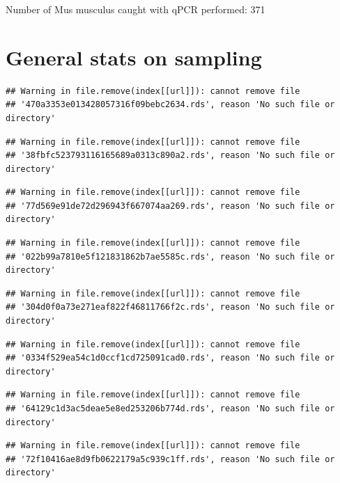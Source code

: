 \documentclass[]{article}
\begin{document}
Number of Mus musculus caught with qPCR performed: 371

\section{General stats on sampling}\label{general-stats-on-sampling-1}

\begin{verbatim}
## Warning in file.remove(index[[url]]): cannot remove file
## '470a3353e013428057316f09bebc2634.rds', reason 'No such file or directory'
\end{verbatim}

\begin{verbatim}
## Warning in file.remove(index[[url]]): cannot remove file
## '38fbfc523793116165689a0313c890a2.rds', reason 'No such file or directory'
\end{verbatim}

\begin{verbatim}
## Warning in file.remove(index[[url]]): cannot remove file
## '77d569e91de72d296943f667074aa269.rds', reason 'No such file or directory'
\end{verbatim}

\begin{verbatim}
## Warning in file.remove(index[[url]]): cannot remove file
## '022b99a7810e5f121831862b7ae5585c.rds', reason 'No such file or directory'
\end{verbatim}

\begin{verbatim}
## Warning in file.remove(index[[url]]): cannot remove file
## '304d0f0a73e271eaf822f46811766f2c.rds', reason 'No such file or directory'
\end{verbatim}

\begin{verbatim}
## Warning in file.remove(index[[url]]): cannot remove file
## '0334f529ea54c1d0ccf1cd725091cad0.rds', reason 'No such file or directory'
\end{verbatim}

\begin{verbatim}
## Warning in file.remove(index[[url]]): cannot remove file
## '64129c1d3ac5deae5e8ed253206b774d.rds', reason 'No such file or directory'
\end{verbatim}

\begin{verbatim}
## Warning in file.remove(index[[url]]): cannot remove file
## '72f10416ae8d9fb0622179a5c939c1ff.rds', reason 'No such file or directory'
\end{verbatim}
\end{document}
